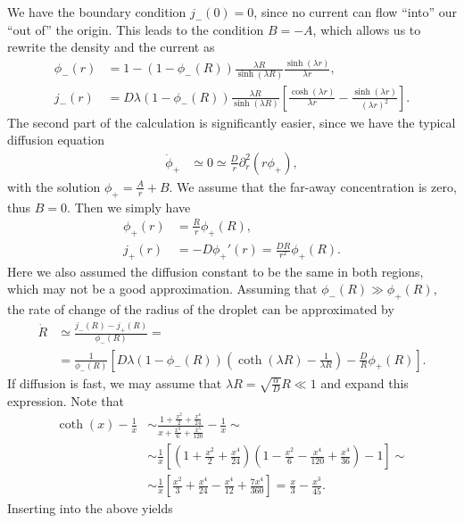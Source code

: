 \documentclass[english, parskip=full]{scrartcl}
\newcommand{\kla}{}
\newcommand{\klam}{}
\begin{document}
We have the boundary condition $j_-(0) = 0$, since no current can flow ``into'' our ``out of'' the origin.
This leads to the condition $B=-A$, which allows us to rewrite the density and the current as
\begin{align}
\phi_-(r) &= 1 - (1 - \phi_-(R)) \frac{\lambda R}{\sinh(\lambda R)} \frac{\sinh(\lambda r)}{\lambda r},\\
j_-(r) &= D\lambda (1 - \phi_-(R)) \frac{\lambda R}{\sinh(\lambda R)} \klam\left[ \frac{\cosh(\lambda r)}{\lambda r} - \frac{\sinh(\lambda r)}{(\lambda r)^2} \right].
\end{align}
The second part of the calculation is significantly easier, since we have the typical diffusion equation
\begin{align}
\dot{\phi}_+ &\simeq 0 \simeq \frac{D}{r}\partial_r^2(r\phi_+),
\end{align}
with the solution $\phi_+ = \frac{A}{r} + B$.
We assume that the far-away concentration is zero, thus $B=0$.
Then we simply have
\begin{align}
\phi_+(r) &= \frac{R}{r}\phi_+(R),\\
j_+(r) &= -D\phi_+'(r) = \frac{DR}{r^2}\phi_+(R).
\end{align}
Here we also assumed the diffusion constant to be the same in both regions, which may not be a good approximation.
Assuming that $\phi_-(R) \gg \phi_+(R)$, the rate of change of the radius of the droplet can be approximated by
\begin{align}
\dot{R} &\simeq \frac{j_-(R) - j_+(R)}{\phi_-(R)} = \\
&= \frac{1}{\phi_-(R)} \klam\left[ D\lambda (1-\phi_-(R)) \kla\left( \coth(\lambda R) - \frac{1}{\lambda R} \right) - \frac{D}{R}\phi_+(R) \right].
\end{align}
If diffusion is fast, we may assume that $\lambda R = \sqrt{\frac{\alpha}{D}} R \ll 1$ and expand this expression.
Note that 
\begin{align}
\coth (x) - \frac{1}{x} &\sim \frac{1 + \frac{x^2}{2} + \frac{x^4}{24}}{x + \frac{x^3}{6} + \frac{x^5}{120}} - \frac{1}{x} \sim \\
&\sim \frac{1}{x} \klam\left[ \kla\left( 1 + \frac{x^2}{2} + \frac{x^4}{24} \right) \kla\left( 1 - \frac{x^2}{6} - \frac{x^4}{120} + \frac{x^4}{36} \right) - 1 \right] \sim \\
&\sim \frac{1}{x} \klam\left[ \frac{x^2}{3} + \frac{x^4}{24} - \frac{x^4}{12} + \frac{7x^4}{360} \right] = \frac{x}{3} - \frac{x^3}{45}.
\end{align}
Inserting into the above yields
\end{document}
